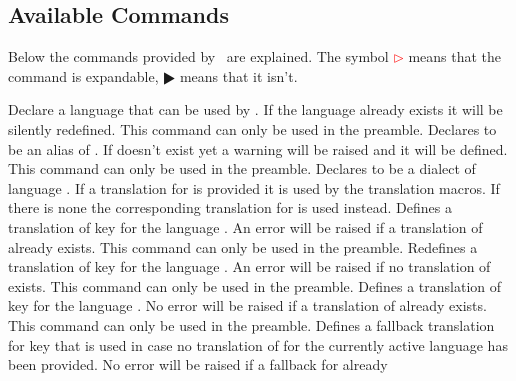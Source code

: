 \documentclass[DIV11,toc=index,toc=bib,numbers=noendperiod]{cnpkgdoc}
\newcommand*\unexpsign{$\RHD$}
\newcommand*\expsign{\textcolor{red}{$\rhd$}}
\begin{document}
\subsection{Available Commands}
Below the commands provided by \translations\ are explained.  The symbol
\expsign{} means that the command is expandable, \unexpsign{} means that it
isn't.
\begin{beschreibung}
 \newline
   Declare a language that can be used by \translations. If the language
   already exists it will be silently redefined. This command can only be used
   in the preamble.
 \newline
   Declares  to be an alias of . If 
   doesn't exist yet a warning will be raised and it will be defined. This
   command can only be used in the preamble.
 \newline
   Declares  to be a dialect of language . If a
   translation for  is provided it is used by the translation
   macros. If there is none the corresponding translation for  is
   used instead.
 \newline
   Defines a translation of key  for the language .
   An error will be raised if a translation of  already exists.
   This command can only be used in the preamble.
 \newline
   Redefines a translation of key  for the language .
   An error will be raised if no translation of  exists.
   This command can only be used in the preamble.
 \newline
   Defines a translation of key  for the language .
   No error will be raised if a translation of  already exists.
   This command can only be used in the preamble.
 \newline
   Defines a fallback translation for key  that is used in case no
   translation of  for the currently active language has been
   provided.  No error will be raised if a fallback for  already

\end{beschreibung}
\end{document}
